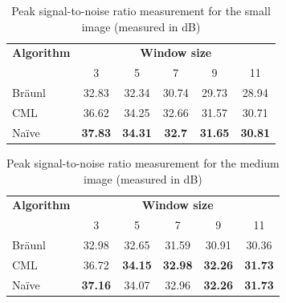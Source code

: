 \begin{table}
\centering
\caption[Peak signal-to-noise for the small image]{Peak signal-to-noise ratio measurement for the small image (measured in dB)}
\label{tab:median:psnrsmall}
\begin{tabular}{@{}lccccc@{}}
\toprule
\multicolumn{1}{c}{\textbf{Algorithm}} & \multicolumn{5}{c}{\textbf{Window size}}                                          \\
                                       & 3              & 5              & 7             & 9              & 11             \\ \midrule
Bräunl                                 & 32.83          & 32.34          & 30.74         & 29.73          & 28.94          \\
CML                                    & 36.62          & 34.25          & 32.66         & 31.57          & 30.71          \\
Naïve                                  & \textbf{37.83} & \textbf{34.31} & \textbf{32.7} & \textbf{31.65} & \textbf{30.81} \\ \bottomrule
\end{tabular}
\end{table}

\begin{table}
\centering
\caption[Peak signal-to-noise for the medium image]{Peak signal-to-noise ratio measurement for the medium image (measured in dB)}
\begin{tabular}{@{}lccccc@{}}
\toprule
\multicolumn{1}{c}{\textbf{Algorithm}} & \multicolumn{5}{c}{\textbf{Window size}}                                           \\
                                       & 3              & 5              & 7              & 9              & 11             \\ \midrule
Bräunl                                 & 32.98          & 32.65          & 31.59          & 30.91          & 30.36          \\
CML                                    & 36.72          & \textbf{34.15} & \textbf{32.98} & \textbf{32.26} & \textbf{31.73} \\
Naïve                                  & \textbf{37.16} & 34.07          & 32.96          & \textbf{32.26} & \textbf{31.73} \\ \bottomrule
\end{tabular}
\label{tab:median:psnrmedium}
\end{table}

